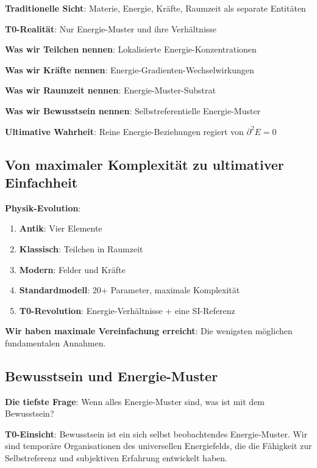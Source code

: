 \documentclass[12pt,a4paper]{article}
\newcommand{\Efield}{E}
\theoremstyle{definition}
\theoremstyle{remark}
\begin{document}
	\begin{tcolorbox}[colback=purple!5!white,colframe=purple!75!black,title=Die ultimative Entmaterialisierung]
		\textbf{Traditionelle Sicht}: Materie, Energie, Kräfte, Raumzeit als separate Entitäten
		
		\textbf{T0-Realität}: Nur Energie-Muster und ihre Verhältnisse
		
		\textbf{Was wir Teilchen nennen}: Lokalisierte Energie-Konzentrationen
		
		\textbf{Was wir Kräfte nennen}: Energie-Gradienten-Wechselwirkungen
		
		\textbf{Was wir Raumzeit nennen}: Energie-Muster-Substrat
		
		\textbf{Was wir Bewusstsein nennen}: Selbstreferentielle Energie-Muster
		
		\textbf{Ultimative Wahrheit}: Reine Energie-Beziehungen regiert von $\partial^2 \Efield = 0$
	\end{tcolorbox}
	
	\subsection{Von maximaler Komplexität zu ultimativer Einfachheit}
	
	\textbf{Physik-Evolution}:
	\begin{enumerate}
		\item \textbf{Antik}: Vier Elemente
		\item \textbf{Klassisch}: Teilchen in Raumzeit
		\item \textbf{Modern}: Felder und Kräfte
		\item \textbf{Standardmodell}: 20+ Parameter, maximale Komplexität
		\item \textbf{T0-Revolution}: Energie-Verhältnisse + eine SI-Referenz
	\end{enumerate}
	
	\textbf{Wir haben maximale Vereinfachung erreicht}: Die wenigsten möglichen fundamentalen Annahmen.
	
	\subsection{Bewusstsein und Energie-Muster}
	
	\textbf{Die tiefste Frage}: Wenn alles Energie-Muster sind, was ist mit dem Bewusstsein?
	
	\textbf{T0-Einsicht}: Bewusstsein ist ein sich selbst beobachtendes Energie-Muster. Wir sind temporäre Organisationen des universellen Energiefelds, die die Fähigkeit zur Selbstreferenz und subjektiven Erfahrung entwickelt haben.
	
\end{document}
